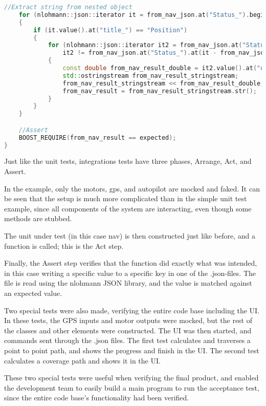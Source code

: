 \begin{lstlisting}[caption = {ReceiveNavigationTransmitter_test}, captionpos=b, label={lst:software_integration_test}, language=C++,firstnumber=1]
	//Extract string from nested object
	for (nlohmann::json::iterator it = from_nav_json.at("Status_").begin(); it != from_nav_json.at("Status_").end(); ++it)
	{
		if (it.value().at("title_") == "Position")
		{
			for (nlohmann::json::iterator it2 = from_nav_json.at("Status_").at(it - from_nav_json.at("Status_").begin()).at("items_").begin();
				it2 != from_nav_json.at("Status_").at(it - from_nav_json\-.at("Status_").begin())\-.at("items_")\-.end(); ++it2)
			{
				const double from_nav_result_double = it2.value().at("data_");
				std::ostringstream from_nav_result_stringstream;
				from_nav_result_stringstream << from_nav_result_double;
				from_nav_result = from_nav_result_stringstream.str();
			}
		}
	}

	//Assert
	BOOST_REQUIRE(from_nav_result == expected);
}
\end{lstlisting}

Just like the unit tests, integrations tests have three phases, Arrange, Act, and Assert. 

In the example, only the motors, gps, and autopilot are mocked and faked. It can be seen that the setup is much more complicated than in the simple unit test example, since all components of the system are interacting, even though some methods are stubbed.

The unit under test (in this case nav) is then constructed just like before, and a function is called; this is the Act step. 

Finally, the Assert step verifies that the function did exactly what was intended, in this case writing a specific value to a specific key in one of the .json-files. The file is read using the nlohmann JSON library, and the value is matched against an expected value.

Two special tests were also made, verifying the entire code base including the UI. In these tests, the GPS inputs and motor outputs were mocked, but the rest of the classes and other elements were constructed. The UI was then started, and commands sent through the .json files. The first test calculates and traverses a point to point path, and shows the progress and finish in the UI. The second test calculates a coverage path and shows it in the UI.

These two special tests were useful when verifying the final product, and enabled the development team to easily build a main program to run the acceptance test, since the entire code base's functionality had been verified.